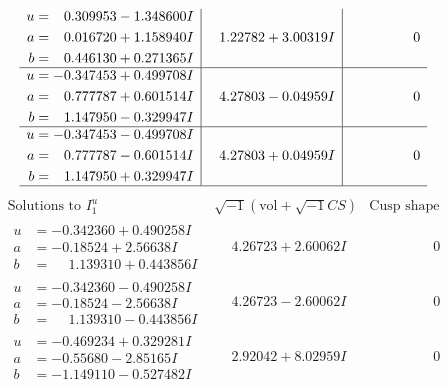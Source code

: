 \documentclass[1p]{elsarticle_modified}
\theoremstyle{definition}
\newcommand{\I}{\sqrt{-1}}
\begin{document}
$$\begin{array}{c|c|c}
\begin{aligned}
u &= \phantom{-}0.309953 - 1.348600 I \\
a &= \phantom{-}0.016720 + 1.158940 I \\
b &= \phantom{-}0.446130 + 0.271365 I\end{aligned}
 & \phantom{-}1.22782 + 3.00319 I & \phantom{-0.000000 } 0 \\ \hline\begin{aligned}
u &= -0.347453 + 0.499708 I \\
a &= \phantom{-}0.777787 + 0.601514 I \\
b &= \phantom{-}1.147950 - 0.329947 I\end{aligned}
 & \phantom{-}4.27803 - 0.04959 I & \phantom{-0.000000 } 0 \\ \hline\begin{aligned}
u &= -0.347453 - 0.499708 I \\
a &= \phantom{-}0.777787 - 0.601514 I \\
b &= \phantom{-}1.147950 + 0.329947 I\end{aligned}
 & \phantom{-}4.27803 + 0.04959 I & \phantom{-0.000000 } 0\\
 \hline 
 \end{array}$$\newpage$$\begin{array}{c|c|c}  
\text{Solutions to }I^u_{1}& \I (\text{vol} + \sqrt{-1}CS) & \text{Cusp shape}\\
 \hline 
\begin{aligned}
u &= -0.342360 + 0.490258 I \\
a &= -0.18524 + 2.56638 I \\
b &= \phantom{-}1.139310 + 0.443856 I\end{aligned}
 & \phantom{-}4.26723 + 2.60062 I & \phantom{-0.000000 } 0 \\ \hline\begin{aligned}
u &= -0.342360 - 0.490258 I \\
a &= -0.18524 - 2.56638 I \\
b &= \phantom{-}1.139310 - 0.443856 I\end{aligned}
 & \phantom{-}4.26723 - 2.60062 I & \phantom{-0.000000 } 0 \\ \hline\begin{aligned}
u &= -0.469234 + 0.329281 I \\
a &= -0.55680 - 2.85165 I \\
b &= -1.149110 - 0.527482 I\end{aligned}
 & \phantom{-}2.92042 + 8.02959 I & \phantom{-0.000000 } 0 \\ \hline\begin{aligned}

\end{aligned}
\end{array}$$
\end{document}
